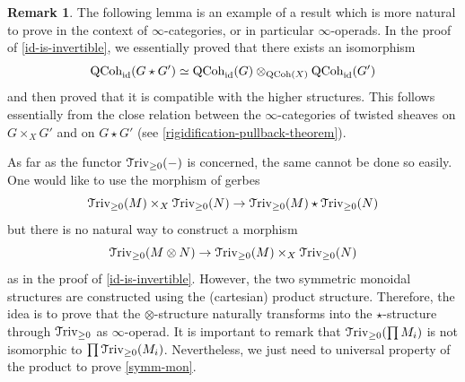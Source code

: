\documentclass[11pt, twoside]{article} %
\numberwithin{equation}{section}
\theoremstyle{plain}
\theoremstyle{definition}
\newtheorem{rem}[thm]{Remark}
\newcommand{\id}{\textup{id}}
\newcommand{\QCoh}{\textup{QCoh}}
\newcommand{\Triv}{\mathcal{T}\textup{riv}}
\begin{document}
\begin{rem}
     The following lemma is an example of a result which is more natural to prove in the context of $\infty$-categories, or in particular $\infty$-operads. In the proof of \cref{id-is-invertible}, we essentially proved that there exists an isomorphism 
     $$ \QCoh_{\id}(G \star G') \simeq \QCoh_{\id}(G) \otimes_{\QCoh(X)} \QCoh_{\id}(G')$$
     and then proved that it is compatible with the higher structures. This follows essentially from the close relation between the $\infty$-categories of twisted sheaves on $G\times_X G'$ and on $G \star G'$ (see \cref{rigidification-pullback-theorem}). 

     As far as the functor $\Triv_{\geq 0}(-)$ is concerned, the same cannot be done so easily. One would like to use the morphism of gerbes
     $$\Triv_{\geq 0}(M) \times_X \Triv_{\geq 0}(N) \rightarrow \Triv_{\geq 0}(M) \star \Triv_{\geq 0}(N)$$
     but there is no natural way to construct a morphism 
     $$ \Triv_{\geq 0}(M \otimes N) \rightarrow \Triv_{\geq 0}(M) \times_X \Triv_{\geq 0}(N)$$ 
     as in the proof of \cref{id-is-invertible}. However, the two symmetric monoidal structures are constructed using the (cartesian) product structure. Therefore, the idea is to prove that the $\otimes$-structure naturally transforms into the $\star$-structure through $\Triv_{\geq 0}$ as $\infty$-operad. It is important to remark that $\Triv_{\geq 0}(\prod M_i)$ is not isomorphic to $\prod \Triv_{\geq 0}( M_i)$. Nevertheless, we just need to universal property of the product to prove \cref{symm-mon}.
     \end{rem}	

 
 
\end{document}
